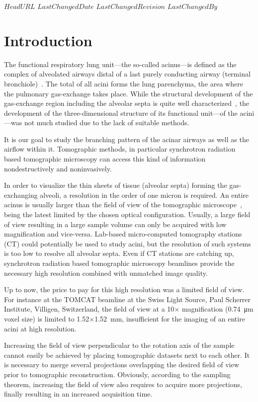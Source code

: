 \svnidlong
{$HeadURL$}
{$LastChangedDate$}
{$LastChangedRevision$}
{$LastChangedBy$}
%
\section{Introduction}
The functional respiratory lung unit---the so-called acinus---is defined as the complex of alveolated airways distal of a last purely conducting airway (terminal bronchiole)~\cite{Rodriguez1987}. The total of all acini forms the lung parenchyma, the area where the pulmonary gas-exchange takes place. While the structural development of the gas-exchange region including the alveolar septa is quite well characterized~\cite{Schittny2007a,Schittny2008,Mund2008}, the development of the three-dimensional structure of its functional unit---of the acini---was not much studied due to the lack of suitable methods. 

It is our goal to study the branching pattern of the acinar airways as well as the airflow within it. Tomographic methods, in particular synchrotron radiation based tomographic microscopy can access this kind of information nondestructively and noninvasively.

In order to visualize the thin sheets of tissue (alveolar septa) forming the gas-exchanging alveoli, a resolution in the order of one micron is required. An entire acinus is usually larger than the field of view of the tomographic microscope~\cite{Rodriguez1987}, being the latest limited by the chosen optical configuration. Usually, a large field of view resulting in a large sample volume can only be acquired with low magnification and vice-versa. Lab-based micro-computed tomography stations (\micro CT) could potentially be used to study acini, but the resolution of such systems is too low to resolve all alveolar septa. Even if \micro CT stations are catching up, synchrotron radiation based tomographic microscopy beamlines provide the necessary high resolution combined with unmatched image quality.

Up to now, the price to pay for this high resolution was a limited field of view. For instance at the TOMCAT beamline \cite{Stampanoni2007} at the Swiss Light Source, Paul Scherrer Institute, Villigen, Switzerland, the field of view at a 10$\times$ magnification (\SI{0.74}{\micro\meter} voxel size) is limited to 1.52$\times$\SI{1.52}{\milli\meter}, insufficient for the imaging of an entire acini at high resolution.

Increasing the field of view perpendicular to the rotation axis of the sample cannot easily be achieved by placing tomographic datasets next to each other. It is necessary to merge several projections overlapping the desired field of view prior to tomographic reconstruction. Obviously, according to the sampling theorem, increasing the field of view also requires to acquire more projections, finally resulting in an increased acquisition time.

